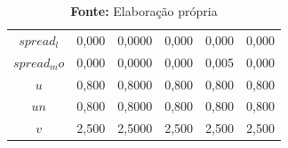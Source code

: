 \begin{table}[H]
\begin{tabular}{cccccc}
\textbf{$spread_l$ } &          0,000 &        0,0000 &            0,000 &        0,000 &            0,000 \\
\textbf{$spread_mo$} &          0,000 &        0,0000 &            0,000 &        0,005 &            0,000 \\
\textbf{$u$        } &          0,800 &        0,8000 &            0,800 &        0,800 &            0,800 \\
\textbf{$un$       } &          0,800 &        0,8000 &            0,800 &        0,800 &            0,800 \\
\textbf{$v$        } &          2,500 &        2,5000 &            2,500 &        2,500 &            2,500 \\
\bottomrule
\end{tabular}
    \label{Summary_Simplest}
    \caption*{\textbf{Fonte:} Elaboração própria}
\end{table}
